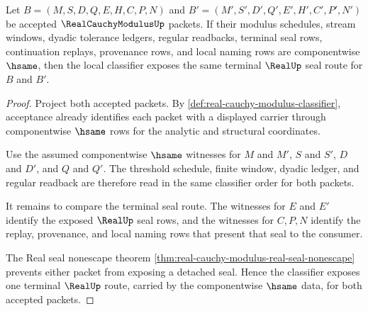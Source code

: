 \begin{theorem}
\label{thm:real-cauchy-modulus-seal-determinacy}
Let $B=(M,S,D,Q,E,H,C,P,N)$ and $B'=(M',S',D',Q',E',H',C',P',N')$ be accepted $\RealCauchyModulusUp$ packets. If their modulus schedules, stream windows, dyadic tolerance ledgers, regular readbacks, terminal seal rows, continuation replays, provenance rows, and local naming rows are componentwise $\hsame$, then the local classifier exposes the same terminal $\RealUp$ seal route for $B$ and $B'$.
\end{theorem}
\begin{proof}
Project both accepted packets. By \autoref{def:real-cauchy-modulus-classifier}, acceptance already identifies each packet with a displayed carrier through componentwise $\hsame$ rows for the analytic and structural coordinates.

Use the assumed componentwise $\hsame$ witnesses for $M$ and $M'$, $S$ and $S'$, $D$ and $D'$, and $Q$ and $Q'$. The threshold schedule, finite window, dyadic ledger, and regular readback are therefore read in the same classifier order for both packets.

It remains to compare the terminal seal route. The witnesses for $E$ and $E'$ identify the exposed $\RealUp$ seal rows, and the witnesses for $C,P,N$ identify the replay, provenance, and local naming rows that present that seal to the consumer.

The Real seal nonescape theorem \autoref{thm:real-cauchy-modulus-real-seal-nonescape} prevents either packet from exposing a detached seal. Hence the classifier exposes one terminal $\RealUp$ route, carried by the componentwise $\hsame$ data, for both accepted packets.
\end{proof}

